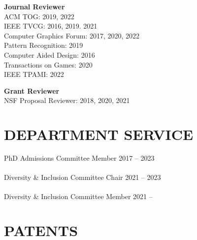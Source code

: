\documentclass[line,margin]{res}
\begin{document}
\begin{resume}
\textbf{Journal Reviewer}\\
ACM TOG: 2019, 2022\\
IEEE TVCG: 2016, 2019. 2021\\
Computer Graphics Forum: 2017, 2020, 2022\\
Pattern Recognition: 2019\\
Computer Aided Design: 2016\\
Transactions on Games: 2020\\
IEEE TPAMI: 2022

\textbf{Grant Reviewer}\\
NSF Proposal Reviewer: 2018, 2020, 2021


\section{DEPARTMENT SERVICE}

PhD Admissions Committee Member \hfill 2017 -- 2023
\\ \\
Diversity \& Inclusion Committee Chair \hfill 2021 -- 2023
\\ \\
Diversity \& Inclusion Committee Member \hfill 2021 -- 








\section{PATENTS}


\end{resume}
\end{document}
